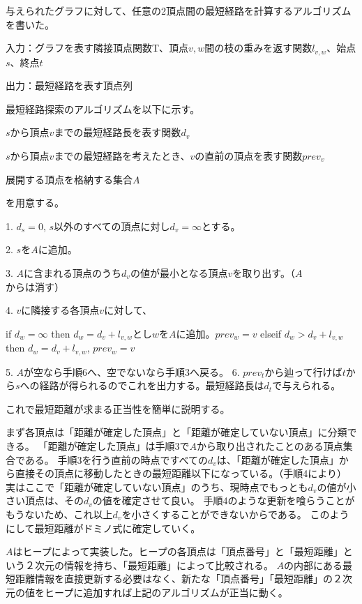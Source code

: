 \documentclass{jlreq}
\begin{document}
与えられたグラフに対して、任意の2頂点間の最短経路を計算するアルゴリズムを書いた。

入力：グラフを表す隣接頂点関数T、頂点${v,w}$間の枝の重みを返す関数$l_{v,w}$、始点$s$、終点$t$

出力：最短経路を表す頂点列

最短経路探索のアルゴリズムを以下に示す。

$s$から頂点$v$までの最短経路長を表す関数$d_v$

$s$から頂点$v$までの最短経路を考えたとき、$v$の直前の頂点を表す関数$prev_v$

展開する頂点を格納する集合$A$

を用意する。

1. $d_s=0$, $s$以外のすべての頂点に対し$d_v=∞$とする。

2. $s$を$A$に追加。

3. $A$に含まれる頂点のうち$d_v$の値が最小となる頂点$v$を取り出す。（$A$からは消す）

4. $v$に隣接する各頂点$v$に対して、

if $d_w=∞$ then $d_w=d_v+l_{v,w}$とし$w$を$A$に追加。$prev_w=v$
elseif $d_w > d_v+l_{v,w}$ then $d_w=d_v+l_{v,w}$, $prev_w=v$

5. $A$が空なら手順6へ、空でないなら手順3へ戻る。
6. $prev_t$から辿って行けば$t$から$s$への経路が得られるのでこれを出力する。最短経路長は$d_t$で与えられる。

これで最短距離が求まる正当性を簡単に説明する。

まず各頂点は「距離が確定した頂点」と「距離が確定していない頂点」に分類できる。
「距離が確定した頂点」は手順3で$A$から取り出されたことのある頂点集合である。
手順3を行う直前の時点ですべての$d_v$は、「距離が確定した頂点」から直接その頂点に移動したときの最短距離以下になっている。（手順4により）
実はここで「距離が確定していない頂点」のうち、現時点でもっとも$d_v$の値が小さい頂点は、その$d_v$の値を確定させて良い。
手順4のような更新を喰らうことがもうないため、これ以上$d_v$を小さくすることができないからである。
このようにして最短距離がドミノ式に確定していく。

$A$はヒープによって実装した。ヒープの各頂点は「頂点番号」と「最短距離」という２次元の情報を持ち、「最短距離」によって比較される。
$A$の内部にある最短距離情報を直接更新する必要はなく、新たな「頂点番号」「最短距離」の２次元の値をヒープに追加すれば上記のアルゴリズムが正当に動く。
\end{document}
